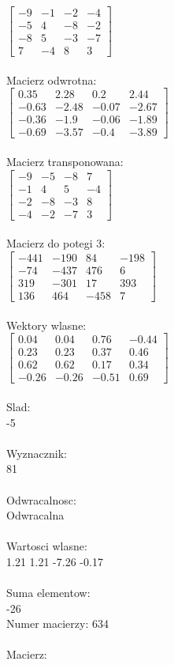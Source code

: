 \documentclass[a4paper,12pt]{article}
\begin{document}
$\begin{bmatrix} -9&-1&-2&-4\\-5&4&-8&-2\\-8&5&-3&-7\\7&-4&8&3 \end{bmatrix}$
\\
\\
Macierz odwrotna:\\

$\begin{bmatrix} 0.35&2.28&0.2&2.44\\-0.63&-2.48&-0.07&-2.67\\-0.36&-1.9&-0.06&-1.89\\-0.69&-3.57&-0.4&-3.89 \end{bmatrix}$
\\
\\
Macierz transponowana:\\

$\begin{bmatrix} -9&-5&-8&7\\-1&4&5&-4\\-2&-8&-3&8\\-4&-2&-7&3 \end{bmatrix}$
\\
\\
Macierz do potegi 3:\\

$\begin{bmatrix} -441&-190&84&-198\\-74&-437&476&6\\319&-301&17&393\\136&464&-458&7 \end{bmatrix}$
\\
\\
Wektory wlasne:\\

$\begin{bmatrix} 0.04&0.04&0.76&-0.44\\0.23&0.23&0.37&0.46\\0.62&0.62&0.17&0.34\\-0.26&-0.26&-0.51&0.69 \end{bmatrix}$
\\
\\
Slad:\\
-5
\\
\\
Wyznacznik:\\
81
\\
\\
Odwracalnosc:\\
Odwracalna
\\
\\
Wartosci wlasne:\\
1.21 1.21 -7.26 -0.17
\\
\\
Suma elementow:\\
-26
\\
\newpage
Numer macierzy:
634
\\
\\
Macierz:\\
\end{document}
